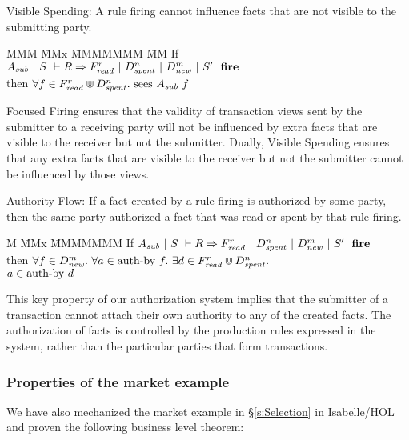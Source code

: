 \begin{theorem}
Visible Spending: A rule firing cannot influence facts that are not visible to the submitting party.
\end{theorem}
\begin{tabbing}
MMM \= MMx \= MMMMMMM \= MM \kill
\> If     \> $A_{\mathit{sub}}~|~S~\vdash R \Rightarrow F_{\mathit{read}}^r~|~D_{\mathit{spent}}^n~|~D_{\mathit{new}}^m~|~S'~~\textbf{fire}$ \\
\> then   \> $\forall f \in F_{\mathit{read}}^r \Cup D_{\mathit{spent}}^n.\ \textrm{sees}~ A_{\mathit{sub}}~ f$
\end{tabbing}

Focused Firing ensures that the validity of transaction views sent by the submitter to a receiving party will not be influenced by extra facts that are visible to the receiver but not the submitter. Dually, Visible Spending ensures that any extra facts that are visible to the receiver but not the submitter cannot be influenced by those views.


\begin{theorem}
Authority Flow: If a fact created by a rule firing is authorized by some party, then the same party authorized a fact that was read or spent by that rule firing.
\end{theorem}
\begin{tabbing}
M \= MMx \= MMMMMMM \kill
\> If   \> $A_{\mathit{sub}}~|~S~\vdash R \Rightarrow F_{\mathit{read}}^r~|~D_{\mathit{spent}}^n~|~D_{\mathit{new}}^m~|~S'~~\textbf{fire}$ \\
\> then \> $\forall f \in D_{\mathit{new}}^m.\
            \forall a \in \textrm{auth-by}~f.\
            \exists d \in F_{\mathit{read}}^r \Cup D_{\mathit{spent}}^n.$ \\
\>      \> \hspace{1em}$a \in \textrm{auth-by}~d$
\end{tabbing}

This key property of our authorization system implies that the submitter of a transaction cannot attach their own authority to any of the created facts. The authorization of facts is controlled by the production rules expressed in the system, rather than the particular parties that form transactions.


\eject{}
\subsubsection{Properties of the market example}
We have also mechanized the market example in \S\ref{s:Selection} in Isabelle/HOL and proven the following business level theorem:

